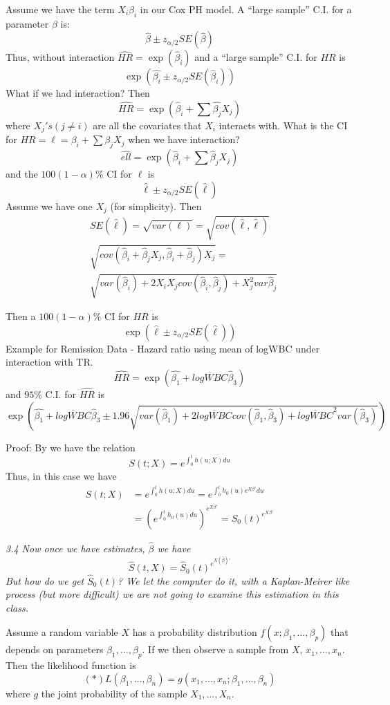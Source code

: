 \documentclass{article}
\begin{document}
Assume we have the term $X_i\beta_i$ in our Cox PH model. A ``large sample'' C.I. for a parameter $\beta$ is:
\[
\hat{\beta} \pm z_{\alpha/2} SE(\hat{\beta})
\]
Thus, without interaction $\hat{HR} = \exp(\hat{\beta}_i)$ and a ``large sample'' C.I. for $HR$ is
\[
\exp(\hat{\beta_i} \pm z_{\alpha/2} SE(\hat{\beta}_i))
\]
What if we had interaction? Then
\[
\hat{HR} = \exp(\hat{\beta}_i + \sum \hat{\beta_j}X_j)
\]
where $X_j's (j \neq i)$ are all the covariates that $X_i$ interacts with. What is the CI for $HR = \ell = \beta_i + \sum \beta_jX_j$ when we have interaction?
\[
\hat{ell} = \exp(\hat{\beta}_i + \sum \hat{\beta}_jX_j)
\]
and the $100(1-\alpha)\%$ CI for $\ell$ is
\[
\hat{\ell} \pm z_{\alpha/2} SE(\hat{\ell})
\]
Assume we have one $X_j$ (for simplicity).
Then
\begin{align*}
& SE(\hat{\ell}) = \sqrt{var(\ell)} = \sqrt{cov(\hat{\ell},\hat{\ell})} \\
&\sqrt{cov(\hat{\beta}_i+ \hat{\beta}_jX_j,\hat{\beta}_i+ \hat{\beta}_j)X_j} = \\
&\sqrt{var(\hat{\beta}_i) + 2X_iX_j cov(\hat{\beta}_i,\hat{\beta}_j) + X_j^2 var{\hat{\beta}_j}}
\end{align*}

Then a $100(1-\alpha)\%$ CI for $HR$ is
\[
\exp(\hat{\ell} \pm z_{\alpha/2} SE(\hat{\ell}))
\]
Example for Remission Data - Hazard ratio using mean of logWBC under interaction with TR.
\[
\hat{HR} = \exp(\hat{\beta_1}+\overline{logWBC}\hat{\beta}_3)
\]
and $95\%$ C.I. for $\hat{HR}$ is
\[
\exp\left(\hat{\beta_1}+\overline{logWBC}\hat{\beta}_3 \pm 1.96 \sqrt{var(\hat{\beta}_1)+2\overline{logWBC}cov(\hat{\beta}_1,\hat{\beta}_3)+\overline{logWBC}^2var(\hat{\beta}_3)}\right)
\]

Proof:
By  we have the relation
\[
S(t;X) = e^{\int_0^t h(u;X)du}
\]
Thus, in this case we have
\begin{align*}
S(t;X) & =  e^{\int_0^t h(u;X)du} = e^{\int_0^t h_0(u)e^{X\beta'}du} \\
& = (e^{\int_0^t h_0(u)du})^{e^{X\beta'}} = S_0(t)^{e^{X\beta'}}
\end{align*}


\it{3.4}
Now once we have estimates, $\hat{\beta}$ we have
\[
\hat{S}(t,X) = \hat{S}_0(t)^{e^{X(\hat{\beta})'}}
\]
But how do we get $\hat{S}_0(t)$? We let the computer do it, with a Kaplan-Meirer like process (but more difficult) we are not going to examine this estimation in this class.


Assume a random variable $X$ has a probability distribution $f(x;\beta_1,\ldots,\beta_p)$ that depends on parameters $\beta_1,\ldots,\beta_p$. If we then observe a sample from $X$, $x_1,\ldots,x_n$. Then the likelihood function is
\[
(*) L(\beta_1,\ldots,\beta_n) = g(x_1,\ldots,x_n;\beta_1,\ldots,\beta_n)
\]
where $g$ the joint probability of the sample $X_1,\ldots,X_n$.
\end{document}
